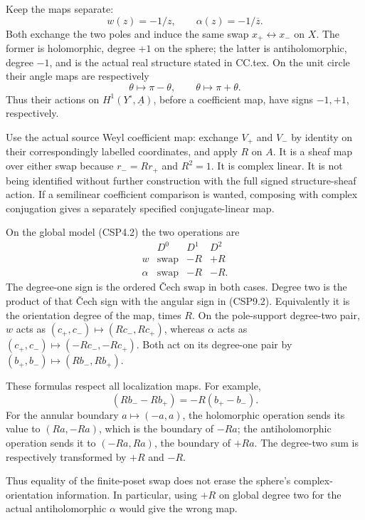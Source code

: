 Keep the maps separate: \[
w(z)=-1/z,\qquad
\alpha(z)=-1/\overline z.
\tag{CSP9.1}
\] Both exchange the two poles and induce the same swap
\(x_+\leftrightarrow x_-\) on \(X\). The former is holomorphic, degree
\(+1\) on the sphere; the latter is antiholomorphic, degree \(-1\), and
is the actual real structure stated in CC.tex. On the unit circle their
angle maps are respectively \[
\theta\mapsto\pi-\theta,\qquad \theta\mapsto\pi+\theta.
\tag{CSP9.2}
\] Thus their actions on \(H^1(Y^\circ,\underline A)\), before a
coefficient map, have signs \(-1,+1\), respectively.

Use the actual source Weyl coefficient map: exchange \(V_+\) and \(V_-\)
by identity on their correspondingly labelled coordinates, and apply
\(R\) on \(A\). It is a sheaf map over either swap because \(r_-=Rr_+\)
and \(R^2=1\). It is complex linear. It is not being identified without
further construction with the full signed structure-sheaf action. If a
semilinear coefficient comparison is wanted, composing with complex
conjugation gives a separately specified conjugate-linear map.

On the global model (CSP4.2) the two operations are \[
\begin{array}{c|ccc}
 &D^0&D^1&D^2\\ \hline
w&\text{swap}&-R&+R\\
\alpha&\text{swap}&-R&-R.
\end{array}
\tag{CSP9.3}
\] The degree-one sign is the ordered Čech swap in both cases. Degree
two is the product of that Čech sign with the angular sign in (CSP9.2).
Equivalently it is the orientation degree of the map, times \(R\). On
the pole-support degree-two pair, \(w\) acts as
\((c_+,c_-)\mapsto(Rc_-,Rc_+)\), whereas \(\alpha\) acts as
\((c_+,c_-)\mapsto(-Rc_-,-Rc_+)\). Both act on its degree-one pair by
\((b_+,b_-)\mapsto(Rb_-,Rb_+)\).

These formulas respect all localization maps. For example, \[
(Rb_--Rb_+)=-R(b_+-b_-).
\] For the annular boundary \(a\mapsto(-a,a)\), the holomorphic
operation sends its value to \((Ra,-Ra)\), which is the boundary of
\(-Ra\); the antiholomorphic operation sends it to \((-Ra,Ra)\), the
boundary of \(+Ra\). The degree-two sum is respectively transformed by
\(+R\) and \(-R\).

Thus equality of the finite-poset swap does not erase the sphere's
complex-orientation information. In particular, using \(+R\) on global
degree two for the actual antiholomorphic \(\alpha\) would give the
wrong map.

